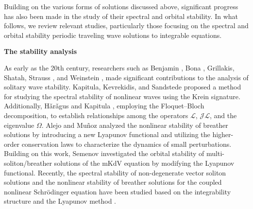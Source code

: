 \documentclass[11pt,reqno]{amsart}
\numberwithin{equation}{section}
\begin{document}
Building on the various forms of solutions discussed above, significant progress has also been made in the study of their spectral and orbital stability.  
In what follows, we review relevant studies, particularly those focusing on the spectral and orbital stability periodic traveling wave solutions  to integrable equations.


\vspace{0.5cm}
\noindent 
\textbf{\Large The stability analysis}
\vspace{0.2cm}

As early as the 20th century, researchers such as Benjamin \cite{Benjamin-72},
Bona \cite{Bona-75,BonaSS-87}, Grillakis, Shatah, Strauss \cite{GrillakisSS-87,GrillakisSS-90}, and Weinstein \cite{Weinstein-85,Weinstein-86}, made significant contributions to the analysis of solitary wave stability. 
%
Kapitula, Kevrekidis, and Sandstede \cite{KapitulaKS-04} proposed a method for studying the spectral stability of nonlinear waves using the Krein signature.
Additionally, H\v{a}r\v{a}gus and Kapitula \cite{HaragusK-08}, employing the Floquet–Bloch decomposition, 
to establish relationships among the operators $\mathcal{L}$, $\mathcal{JL}$, and the eigenvalue $\Omega$.
Alejo and Mu\~{n}oz \cite{Alejo-2013-nonlinear} analyzed the nonlinear stability of breather solutions by introducing a new Lyapunov functional and utilizing the higher-order conservation laws to characterize the dynamics of small perturbations.
Building on this work, Semenov \cite{Semenov-2022-orbital} investigated the orbital stability of multi-soliton/breather solutions of the mKdV equation by modifying the Lyapunov functional.
Recently, the spectral stability of non-degenerate vector soliton solutions
and the nonlinear stability of breather solutions for the coupled nonlinear Schr\"{o}dinger equation have been studied based on the integrability structure and the Lyapunov method \cite{LingPS-2024}.
\end{document}
